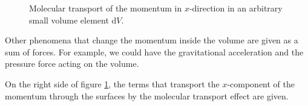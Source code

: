 \documentclass[MathematicsNumericsDerivationsAndOpenFOAM.tex]{subfiles}
\begin{document}
\begin{figure}[!b]
\caption{Molecular transport of the momentum in $x$-direction in an arbitrary small volume element d$V$.}
\label{Abb_Grundlagen_2_Impulserhaltung}
\end{figure}
%
%

	Other phenomena that change the momentum inside the volume are given as
    a sum of forces. For example, we could have the gravitational acceleration
    and the pressure force acting on the volume.

    On the right side of figure \ref{Abb_Grundlagen_2_Impulserhaltung}, the
    terms that transport the $x$-component of the momentum through the
    surfaces by the molecular transport effect are given.
%
%
\end{document}
